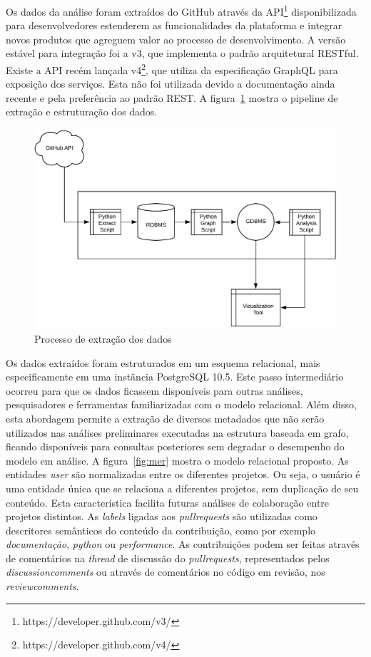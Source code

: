 \documentclass[peerreview]{acmart}
\begin{document}
Os dados da análise foram extraídos do GitHub através da API\footnote{https://developer.github.com/v3/} disponibilizada para desenvolvedores estenderem as funcionalidades da plataforma e integrar novos produtos que agreguem valor ao processo de desenvolvimento. A versão estável para integração foi a v3, que implementa o padrão arquitetural RESTful\cite{fielding2002}. Existe a API recém lançada v4\footnote{https://developer.github.com/v4/}, que utiliza da especificação GraphQL para exposição dos serviços. Esta não foi utilizada devido a documentação ainda recente e pela preferência ao padrão REST. A figura~\ref{fig:processo_extracao} mostra o pipeline de extração e estruturação dos dados.

\begin{figure}[!htbp]
 \includegraphics[width=\columnwidth]{processo_extracao}
 \caption{Processo de extração dos dados}\label{fig:processo_extracao}
\end{figure}

Os dados extraídos foram estruturados em um esquema relacional, mais especificamente em uma instância PostgreSQL 10.5. Este passo intermediário ocorreu para que os dados ficassem disponíveis para outras análises, pesquisadores e ferramentas familiarizadas com o modelo relacional. Além disso, esta abordagem permite a extração de diversos metadados que não serão utilizados nas análises preliminares executadas na estrutura baseada em grafo, ficando disponíveis para consultas posteriores sem degradar o desempenho do modelo em análise. A figura~\ref{fig:mer} mostra o modelo relacional proposto. As entidades \textit{user} são normalizadas entre os diferentes projetos. Ou seja, o usuário é uma entidade única que se relaciona a diferentes projetos, sem duplicação de seu conteúdo. Esta característica facilita futuras análises de colaboração entre projetos distintos. As \textit{labels} ligadas aos \textit{pullrequests} são utilizadas como descritores semânticos do conteúdo da contribuição, como por exemplo \textit{documentação}, \textit{python} ou \textit{performance}. As contribuições podem ser feitas através de comentários na \textit{thread} de discussão do \textit{pullrequests}, representados pelos \textit{discussioncomments} ou através de comentários no código em revisão, nos \textit{reviewcomments}.
\end{document}
